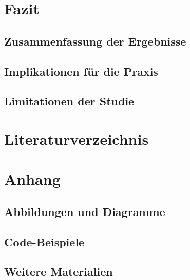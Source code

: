 \documentclass[12pt,a4paper,bibliography=totocnumbered,listof=totocnumbered]{scrartcl}
\begin{document}
\section{Fazit}
\subsection{Zusammenfassung der Ergebnisse}
\subsection{Implikationen für die Praxis}
\subsection{Limitationen der Studie}

\section{Literaturverzeichnis}

\section{Anhang}
\subsection{Abbildungen und Diagramme}
\subsection{Code-Beispiele}
\subsection{Weitere Materialien}
\end{document}
